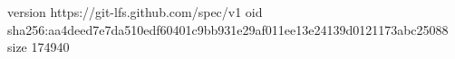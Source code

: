 version https://git-lfs.github.com/spec/v1
oid sha256:aa4deed7e7da510edf60401c9bb931e29af011ee13e24139d0121173abc25088
size 174940

